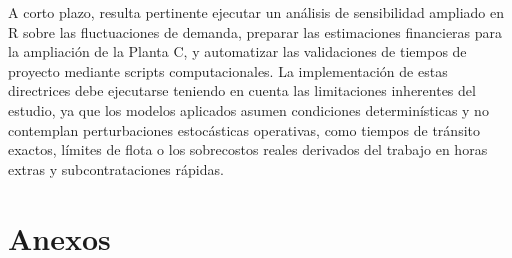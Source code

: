 \documentclass[12pt]{article}
\begin{document}
A corto plazo, resulta pertinente ejecutar un análisis de sensibilidad ampliado en R sobre las fluctuaciones de demanda, preparar las estimaciones financieras para la ampliación de la Planta C, y automatizar las validaciones de tiempos de proyecto mediante scripts computacionales. La implementación de estas directrices debe ejecutarse teniendo en cuenta las limitaciones inherentes del estudio, ya que los modelos aplicados asumen condiciones determinísticas y no contemplan perturbaciones estocásticas operativas, como tiempos de tránsito exactos, límites de flota o los sobrecostos reales derivados del trabajo en horas extras y subcontrataciones rápidas.

\section{Anexos}
\end{document}
